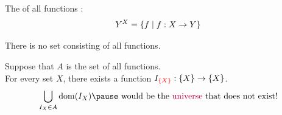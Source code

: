 %
%

\begin{frame}{}
  \begin{definition}[$Y^{X}$]
    The  of all functions :
    \[
      Y^{X} = \{f \mid f: X \to Y\}
    \]
  \end{definition}


  \pause
  \begin{theorem}
    There is no set consisting of all functions.
  \end{theorem}

  \pause
  \begin{center}
    Suppose  that $A$ is the set of all functions. \\[8pt]

    \pause
    For every set $X$, there exists a function $I_{\textcolor{red}{\{X\}}}: \{X\} \to \{X\}$.
    \pause
    \[
      \bigcup_{I_{X} \in A} \dom(I_{X})
        \pause\text{ would be the \purple{universe} that does not exist!}
    \]
  \end{center}
\end{frame}
